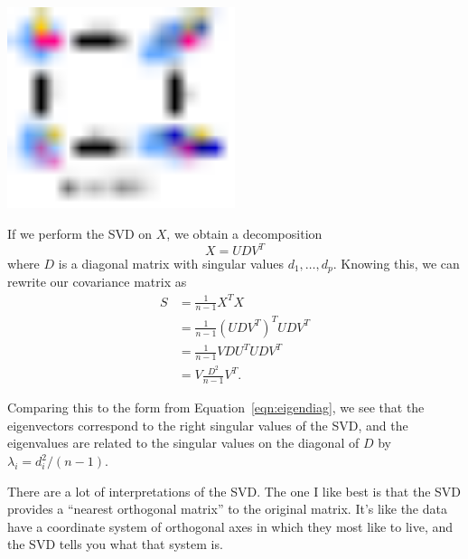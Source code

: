 \begin{center}
\includegraphics[width=0.5\textwidth]{img/l04-svd.pdf}
\end{center}

\noindent If we perform the SVD on $X$, we obtain a decomposition
$$ X = U D V^T $$
where $D$ is a diagonal matrix with singular values $d_1, \dots, d_p$. Knowing this, we can rewrite our covariance matrix as
\begin{align*} S &= \frac{1}{n-1} X^T X \\
&= \frac{1}{n-1} (UDV^T)^T U D V^T \\
&= \frac{1}{n-1} V D U^T U D V^T \\
&= V \frac{D^2}{n-1} V^T. \end{align*}

Comparing this to the form from Equation~\ref{eqn:eigendiag}, we see that the eigenvectors correspond to the right singular values of the SVD, and the eigenvalues are related to the singular values on the diagonal of $D$ by $\lambda_i = d_i^2/(n-1)$.

There are a lot of interpretations of the SVD. The one I like best is that the SVD provides a ``nearest orthogonal matrix'' to the original matrix. It's like the data have a coordinate system of orthogonal axes in which they most like to live, and the SVD tells you what that system is.


